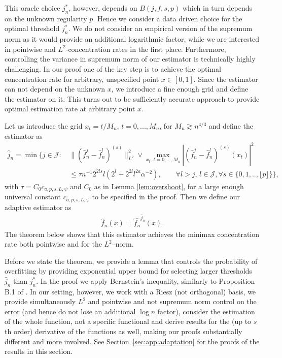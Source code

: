 \documentclass[preprint]{imsart}
\numberwithin{equation}{section}
\begin{document}
This oracle choice $j_n^{*}$, however, depends on $B(j,f,s,p)$ which in turn depends on the unknown regularity $p$. Hence we consider a data driven choice for the optimal threshold $j^*_n$. We do not consider an empirical version of the supremum norm as it would provide an additional logarithmic factor, while we are interested in pointwise and $L^2$-concentration rates in the first place. Furthermore, controlling the variance in supremum norm of our estimator is technically highly challenging. In our proof one of the key step is to achieve the optimal concentration rate for arbitrary, unspecified point $x\in[0,1]$. Since the estimator can not depend on the unknown $x$, we introduce a fine enough grid and define the estimator on it. This turns out to be sufficiently accurate approach to provide optimal estimation rate at arbitrary point $x$.

Let us introduce the grid $x_t=t/M_n$, $t=0,...,M_n$, for $M_n\gtrsim n^{4/3}$ and define the estimator as
\begin{align}
\hat{j}_n=\min \Big\{ j\in\mathcal{J}:\,& \| (\hat{f}_n^{j}-\hat{f}_n^l)^{(s)}\|_{L^2}^2\vee \max_{x_t,\, t=0,...,M_n}|(\hat{f}_n^{j}- \hat{f}_n^l )^{(s)}(x_t)|^2\nonumber\\
&\leq \tau  n^{-1}2^{2ls}l (2^{l}+2^{2l}l^{2a}\alpha^{-2}),
 \qquad\forall l>j,\, l\in\mathcal{J},\forall s\in\{0,1,..,\lfloor p\rfloor\} 
 \Big\},\label{def:hat:jn}
\end{align}
with $\tau= C_0c_{a,p,s,L,\psi}$ and $C_0$ as in Lemma \ref{lem:overshoot}, for a large enough universal constant $c_{a,p,s,L,\psi}$ to be specified in the proof.
Then we define our adaptive estimator as
\begin{align}
\hat{f}_n(x)=\hat{f_n}^{\hat{j}_n}(x).\label{def:Lepski}
\end{align}
The theorem below shows that this estimator achieves the minimax concentration rate both pointwise and for the $L^2$--norm.

Before we state the theorem, we provide a lemma that controls the probability of overfitting by providing exponential upper bound for selecting larger thresholds $\hat{j}_n$ than $j_n^*$. In the proof we apply Bernstein's inequality, similarly to  Proposition B.1 of \cite{ButuceaPrivacy}. In our setting, however, we work with a Riesz (not orthogonal) basis, we provide simultaneously $L^2$ and pointwise and not supremum norm control on the error (and hence do not lose an additional $\log n$ factor), consider the estimation of the whole function, not a specific functional and derive results for the (up to $s$th order) derivative of the functions as well, making our proofs substantially different and more involved. See Section~\ref{sec:app:adaptation} for the proofs of the results in this section.
\end{document}
